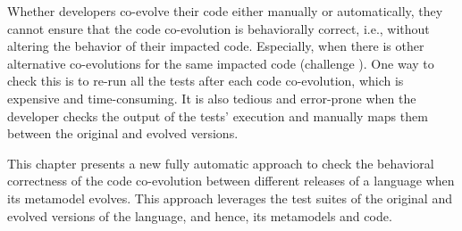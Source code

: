 
Whether developers co-evolve their code either manually or automatically, they cannot ensure that the code co-evolution is behaviorally correct, i.e., without altering the behavior of their impacted code. Especially, when there is other alternative co-evolutions for the same impacted code (challenge ). 
One way to check this is to re-run all the tests after each code co-evolution, which is expensive and time-consuming. It is also tedious and error-prone when the developer checks the output of the tests' execution and manually maps them between the original and evolved versions.

This chapter presents a new fully automatic approach to check the behavioral correctness of the code co-evolution between different releases of a language when its metamodel evolves. This approach leverages the test suites of the original and evolved versions of the language, and hence, its metamodels and code. 

